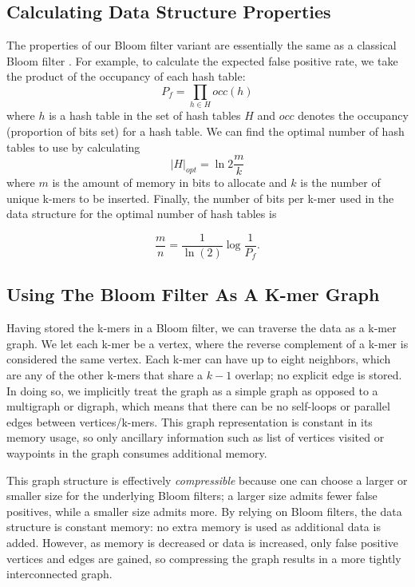 \documentclass[12pt]{article} \usepackage{simplemargins}
\begin{document}
\subsection{Calculating Data Structure Properties}
The properties of our Bloom filter variant are essentially the
same as a classical Bloom filter \cite{bloomsurvey}.
For example, to calculate the expected false positive 
rate, we
take the product of the occupancy of each hash table:
\begin{displaymath}
P_f = \prod_{h \in H} occ(h)
\end{displaymath}
where $h$ is a hash table in the set of hash tables $H$ and $occ$ denotes
the occupancy (proportion of bits set) for a hash table.
We can find the optimal number of hash tables
to use by calculating
\begin{displaymath}
\vert H \vert_{opt} = \ln 2 \frac{m}{k}
\end{displaymath}
where $m$ is the amount of memory in bits to allocate and $k$
is the number of unique k-mers to be inserted. Finally,
the number of bits per
k-mer used in the data structure for the optimal number of hash 
tables is

\begin{displaymath}
\frac{m}{n} = \frac{1}{\ln(2)} \log{\frac{1}{P_f}}.
\end{displaymath}

\subsection{Using The Bloom Filter As A K-mer Graph}
Having stored the k-mers in a Bloom filter, we can traverse
the data as a k-mer graph. We let each k-mer be a vertex, where
the reverse complement of a k-mer is considered the same
vertex. Each k-mer can
have up to eight neighbors, which are any of the other k-mers that
 share a $k-1$
overlap; no explicit edge is stored. In doing so, we implicitly 
treat the graph as a simple graph as opposed to a multigraph or 
digraph, which means that there can be no self-loops or parallel 
edges between vertices/k-mers. This graph representation is constant 
in its memory usage, so only ancillary information such as list 
of vertices visited or waypoints in the graph consumes additional 
memory.

This graph structure is effectively {\em compressible}
because one can choose a larger
or smaller size for the underlying Bloom filters; a larger size admits fewer
false positives, while a smaller size admits more. By relying on Bloom
filters, the data structure is constant memory: no extra memory is
used as additional data is added. However, as memory is decreased or data
is increased, only false positive vertices and edges are gained, so
compressing the graph results in a more tightly interconnected graph.
\end{document}
